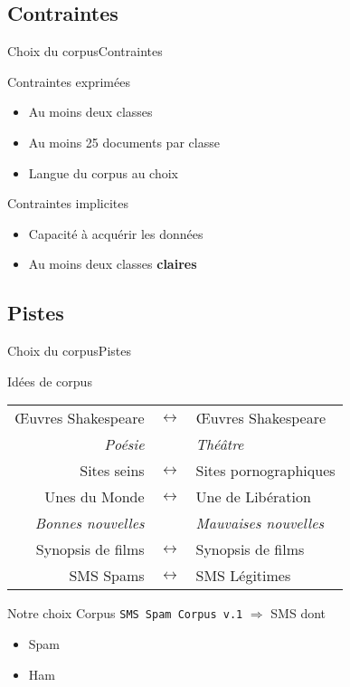 \subsection{Contraintes}
\begin{frame}{Choix du corpus}{Contraintes}
\begin{block}{Contraintes exprimées}
	\begin{itemize}
	\item Au moins deux classes
	\item Au moins 25 documents par classe
	\item Langue du corpus au choix
	\end{itemize}
\end{block}
\begin{block}{Contraintes implicites}
	\begin{itemize}
	\item Capacité à acquérir les données
	\item Au moins deux classes \textbf{claires}
	\end{itemize}
\end{block}
\end{frame}

\subsection{Pistes}
\begin{frame}{Choix du corpus}{Pistes}
\begin{block}{Idées de corpus}
\begin{center}
	\begin{tabular}{|r c l|}
	\hline
	Œuvres Shakespeare & $\leftrightarrow$ & Œuvres Shakespeare \\
	\textit{Poésie} & & \textit{Théâtre} \\
	\hline
	Sites seins & $\leftrightarrow$ & Sites pornographiques \\
	\hline
	Unes du Monde & $\leftrightarrow$ & Une de Libération \\
	\textit{Bonnes nouvelles} & & \textit{Mauvaises nouvelles} \\
	\hline
	Synopsis de films & $\leftrightarrow$ & Synopsis de films \\	
	\hline
	SMS Spams & $\leftrightarrow$ & SMS Légitimes \\	
	\hline
	\end{tabular}
\end{center}
\end{block}
\pause
\begin{block}{Notre choix}
Corpus \texttt{SMS Spam Corpus v.1} $\Rightarrow$  SMS dont
		\begin{itemize}
			\item {} Spam
			\item {} Ham
		\end{itemize}
\end{block}
\end{frame}

